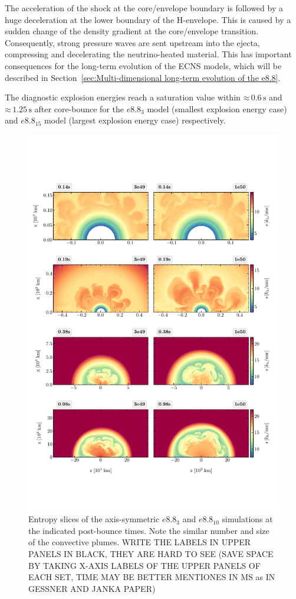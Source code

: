 \documentclass[fleqn,usenatbib]{mnras}
\renewcommand{\sec}{\xspace\ensuremath{\text{s}}}
\newcommand{\NY}[2]{{\color{blue}\sout{#1}#2}}
\begin{document}
The acceleration of the shock at the core/envelope boundary is followed by a huge deceleration at the lower boundary of the H-envelope. This is caused by a sudden change of the density gradient at the core/envelope transition.  
Consequently, strong pressure waves are sent upstream into the ejecta, compressing and decelerating the neutrino-heated material. This has important consequences for the long-term evolution of the ECNS models, which will be described in Section~\ref{sec:Multi-dimensional long-term evolution of the e8.8}.

The diagnostic explosion energies reach a saturation value within $\mathord{\approx}\,  0.6\,\sec$ and $\mathord{\approx}\, 1.25\,\sec$ after core-bounce for the $e8.8_{3}$ model (smallest explosion energy case) and $e8.8_{15}$ model (largest explosion energy case) respectively.

\begin{figure} %
 \includegraphics[trim=0cm 2.3cm 0cm 2.2cm,clip]{pic/e8_sto_cuts_2d_1e50_3e49_paper.pdf}
 \caption{Entropy slices of the axis-symmetric $e8.8_{3}$ and  $e8.8_{10}$ simulations at the indicated post-bounce times. Note the similar number and size of the convective plumes. \NY{}{WRITE THE LABELS IN UPPER PANELS IN BLACK, THEY ARE HARD TO SEE (SAVE SPACE BY TAKING X-AXIS LABELS OF THE UPPER PANELS OF EACH SET, TIME MAY BE BETTER MENTIONES IN MS as IN GESSNER AND JANKA PAPER)}}\label{fig:e8 2d sto times}
\end{figure}
\end{document}
